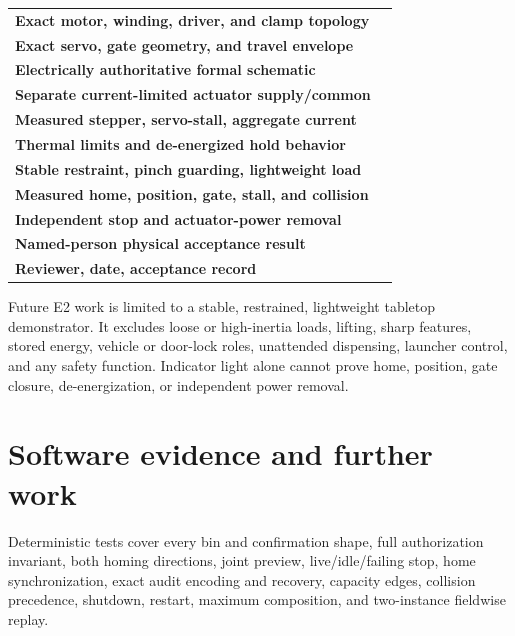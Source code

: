 \documentclass[10pt]{article}
\begin{document}
\begin{tabularx}{\linewidth}{@{}>{\bfseries}l X@{}}
Exact motor, winding, driver, and clamp topology & \rule{0pt}{16pt}\hrulefill\\[9pt]
Exact servo, gate geometry, and travel envelope & \hrulefill\\[9pt]
Electrically authoritative formal schematic & \hrulefill\\[9pt]
Separate current-limited actuator supply/common & \hrulefill\\[9pt]
Measured stepper, servo-stall, aggregate current & \hrulefill\\[9pt]
Thermal limits and de-energized hold behavior & \hrulefill\\[9pt]
Stable restraint, pinch guarding, lightweight load & \hrulefill\\[9pt]
Measured home, position, gate, stall, and collision & \hrulefill\\[9pt]
Independent stop and actuator-power removal & \hrulefill\\[9pt]
Named-person physical acceptance result & \hrulefill\\[9pt]
Reviewer, date, acceptance record & \hrulefill\\
\end{tabularx}

Future E2 work is limited to a stable, restrained, lightweight tabletop
demonstrator. It excludes loose or high-inertia loads, lifting, sharp
features, stored energy, vehicle or door-lock roles, unattended dispensing,
launcher control, and any safety function. Indicator light alone cannot prove
home, position, gate closure, de-energization, or independent power removal.

\section{Software evidence and further work}
Deterministic tests cover every bin and confirmation shape, full authorization
invariant, both homing directions, joint preview, live/idle/failing stop,
home synchronization, exact audit encoding and recovery, capacity edges,
collision precedence, shutdown, restart, maximum composition, and two-instance
fieldwise replay.
\end{document}

